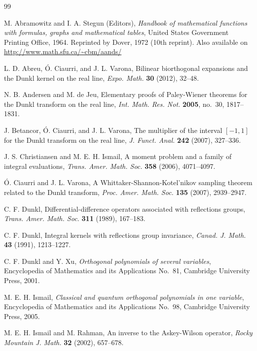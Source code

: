\documentclass[12pt,a4paper]{amsart}
\theoremstyle{plain}
\theoremstyle{definition}
\begin{document}
\begin{thebibliography}{99}

 M. Abramowitz and I. A. Stegun (Editors),
\textit{Handbook of mathematical functions with formulas, graphs
and mathematical tables}, United States Government Printing
Office, 1964.
Reprinted by Dover, 1972 (10th reprint). Also available on
\url{http://www.math.sfu.ca/~cbm/aands/}

 L. D. Abreu, \'O. Ciaurri, and J. L. Varona,
Bilinear biorthogonal expansions and the Dunkl kernel on the real line,
\textit{Expo. Math.} \textbf{30} (2012), 32--48.

 N. B. Andersen and M. de Jeu, {Elementary proofs of
Paley-Wiener theorems for the Dunkl transform on the real line},
\textit{Int. Math. Res. Not.} \textbf{2005}, no.~30, 1817--1831.

 J. Betancor, \'O. Ciaurri, and J. L. Varona, {The multiplier
of the interval $[-1,1]$ for the Dunkl transform on the real line,}
\textit{J. Funct. Anal.} \textbf{242} (2007), 327--336.

 J. S. Christiansen and M. E. H. Ismail,
{A moment problem and a family of integral evaluations},
\textit{Trans. Amer. Math. Soc.}  \textbf{358} (2006), 4071--4097.

 \'O. Ciaurri and J. L. Varona, {A Whittaker-Shannon-Kotel'nikov
sampling theorem related to the Dunkl transform,} \textit{Proc. Amer. Math.
Soc.} \textbf{135} (2007), 2939--2947.

 C. F. Dunkl, {Differential-difference operators associated
with reflections groups,} \textit{Trans. Amer. Math. Soc.} \textbf{311}
(1989), 167--183.

 C. F. Dunkl, {Integral kernels with reflections group
invariance,} \textit{Canad. J. Math.} \textbf{43} (1991), 1213--1227.

 C. F. Dunkl and Y. Xu,
\textit{Orthogonal polynomials of several variables},
Encyclopedia of Mathematics and its Applications No.~81,
Cambridge University Press, 2001.

 M. E. H. Ismail, \textit{Classical and
quantum orthogonal polynomials in one variable},
Encyclopedia of Mathematics and its Applications No.~98,
Cambridge University Press, 2005.

 M. E. H. Ismail and M. Rahman,
{An inverse to the Askey-Wilson operator},
\textit{Rocky Mountain J. Math.} \textbf{32} (2002), 657--678.


\end{thebibliography}
\end{document}

